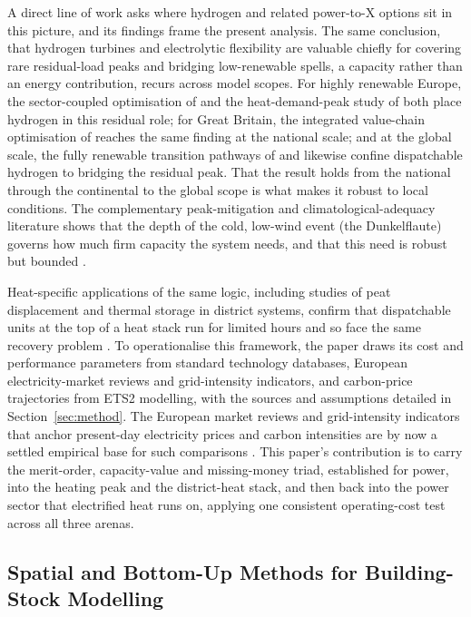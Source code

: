 A direct line of work asks where hydrogen and related power-to-X options sit in this
picture, and its findings frame the present analysis. The same conclusion, that hydrogen
turbines and electrolytic flexibility are valuable chiefly for covering rare
residual-load peaks and bridging low-renewable spells, a capacity rather than an energy
contribution, recurs across model scopes. For highly renewable Europe, the
sector-coupled optimisation of \citet{Brown2018Synergies} and the heat-demand-peak study
of \citet{Zeyen2021Mitigating} both place hydrogen in this residual role; for Great
Britain, the integrated value-chain optimisation of \citet{Quarton2019Value} reaches the
same finding at the national scale; and at the global scale, the fully renewable
transition pathways of \citet{Bogdanov2019Radical} and \citet{Victoria2021Solar}
likewise confine dispatchable hydrogen to bridging the residual peak. That the result
holds from the national through the continental to the global scope is what makes it
robust to local conditions. The complementary peak-mitigation and
climatological-adequacy literature shows that the depth of the cold, low-wind event (the
Dunkelflaute) governs how much firm capacity the system needs, and that this need is
robust but bounded \citep{Zeyen2021Mitigating,Mellot2024Mitigating}.

Heat-specific applications of the same logic, including studies of peat displacement and
thermal storage in district systems, confirm that dispatchable units at the top of a
heat stack run for limited hours and so face the same recovery problem
\citep{Javanshir2022Abandoning,Enescu2020Thermal}. To operationalise this framework, the
paper draws its cost and performance parameters from standard technology databases,
European electricity-market reviews and grid-intensity indicators, and carbon-price
trajectories from ETS2 modelling, with the sources and assumptions detailed in
Section~\ref{sec:method}. The European market reviews and grid-intensity indicators that
anchor present-day electricity prices and carbon intensities are by now a settled
empirical base for such comparisons \citep{EMBER2024electricity, EEA2024gridintensity}.
This paper's contribution is to carry the merit-order, capacity-value and missing-money
triad, established for power, into the heating peak and the district-heat stack, and
then back into the power sector that electrified heat runs on, applying one consistent
operating-cost test across all three arenas.

\subsection{Spatial and Bottom-Up Methods for Building-Stock Modelling}
\label{sec:lit:spatial}

